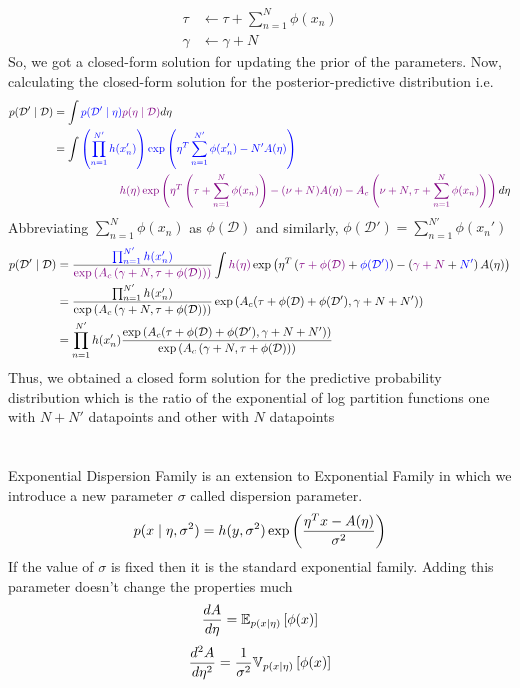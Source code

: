 \documentclass{homework}
\begin{document}
$$
\begin{aligned}
\tau &\leftarrow \tau + \sum_{n=1}^N \phi(x_n)\\
\gamma &\leftarrow \gamma + N
\end{aligned}
$$
So, we got a closed-form solution for updating the prior of the parameters.
Now, calculating the closed-form solution for the posterior-predictive distribution i.e. 
$$
\begin{aligned}
p(\mathcal D' \mid \mathcal D) &= \int \color{blue}p(\mathcal D' \mid \eta) \color{violet} p(\eta \mid \mathcal D) \color{black}d\eta \\
&= \int \color{blue}\left(\prod_{n=1}^{N'} h(x_n')\right)\exp\left(\eta^T\sum_{n=1}^{N'}\phi(x_n') - N'A(\eta)\right)\\ & \qquad \qquad\qquad\color{violet}h(\eta)\exp\left(\eta^T\left(\tau+\sum_{n=1}^N\phi(x_n)\right)-(\nu+N)A(\eta) - A_c\left(\nu+N,\tau + \sum_{n=1}^N\phi(x_n)\right)\right)\color{black}d\eta\\
\end{aligned}
$$
Abbreviating $\sum_{n=1}^N \phi(x_n)$ as $\phi(\mathcal D)$ and similarly, $\phi(\mathcal D') = \sum_{n=1}^{N'} \phi(x_n')$
$$
\begin{aligned}
p(\mathcal D' \mid \mathcal D) &= {\color{blue}\prod_{n=1}^{N'} h(x_n') \color{black}\over \color{violet}\exp\left(A_c\left(\gamma+N,\tau + \phi(\mathcal D)\right)\right)}\int \color{violet}h(\eta)\color{black} \exp\left(\eta^T\left(\color{violet}\tau + \phi(\mathcal D) \color{black}+ \color{blue}  \phi(\mathcal D')\color{black}\right) - \left(\color{violet}\gamma + N \color{black}+ \color{blue}N'\color{black}\right)A(\eta)\right) \\
&= {\prod_{n=1}^{N'} h(x_n') \over \exp\left(A_c\left(\gamma+N,\tau + \phi(\mathcal D)\right)\right)} \exp\left(A_c(\tau + \phi(\mathcal D) + \phi(\mathcal D'), \gamma + N + N')\right)\\\
&= \prod_{n=1}^{N'} h(x_n') {\exp\left(A_c(\tau + \phi(\mathcal D) + \phi(\mathcal D'), \gamma + N + N') \right)\over \exp \left(A_c\left(\gamma+N,\tau + \phi(\mathcal D)\right)\right)}
\end{aligned}
$$
Thus, we obtained a closed form solution for the predictive probability distribution which is the ratio of the exponential of log partition functions one with $N + N'$ datapoints and other with $N$ datapoints

\section{}
Exponential Dispersion Family is an extension to Exponential Family in which we introduce a new parameter $\sigma$ called dispersion parameter.
$$
p(x\mid \eta, \sigma^2) = h(y,\sigma^2) \exp\left(\eta^T x - A(\eta) \over \sigma^2\right)
$$
If the value of $\sigma$ is fixed then it is the standard exponential family. Adding this parameter doesn't change the properties much
$${d A \over d \eta} = \mathbb{E}_{p(x\mid \eta)}\left[\phi(x)\right]$$
$${d^2 A \over d \eta^2} = {1\over \sigma^2}\mathbb{V}_{p(x\mid \eta)}\left[\phi(x)\right]$$
\end{document}
